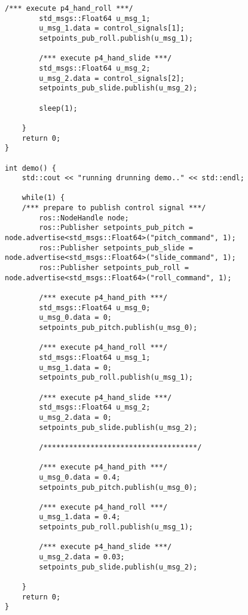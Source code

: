 \begin{lstlisting}[language=gedit]
        /*** execute p4_hand_roll ***/
        std_msgs::Float64 u_msg_1;
        u_msg_1.data = control_signals[1];
        setpoints_pub_roll.publish(u_msg_1);

        /*** execute p4_hand_slide ***/
        std_msgs::Float64 u_msg_2;
        u_msg_2.data = control_signals[2];
        setpoints_pub_slide.publish(u_msg_2);
        
        sleep(1);
 
    }
    return 0;
}

int demo() {
    std::cout << "running drunning demo.." << std::endl;
 
    while(1) {
    /*** prepare to publish control signal ***/ 
        ros::NodeHandle node;
        ros::Publisher setpoints_pub_pitch = node.advertise<std_msgs::Float64>("pitch_command", 1);
        ros::Publisher setpoints_pub_slide = node.advertise<std_msgs::Float64>("slide_command", 1);
        ros::Publisher setpoints_pub_roll = node.advertise<std_msgs::Float64>("roll_command", 1);

        /*** execute p4_hand_pith ***/
        std_msgs::Float64 u_msg_0;
        u_msg_0.data = 0;
        setpoints_pub_pitch.publish(u_msg_0);

        /*** execute p4_hand_roll ***/
        std_msgs::Float64 u_msg_1;
        u_msg_1.data = 0;
        setpoints_pub_roll.publish(u_msg_1);

        /*** execute p4_hand_slide ***/
        std_msgs::Float64 u_msg_2;
        u_msg_2.data = 0;
        setpoints_pub_slide.publish(u_msg_2);

        /************************************/

        /*** execute p4_hand_pith ***/
        u_msg_0.data = 0.4;
        setpoints_pub_pitch.publish(u_msg_0);

        /*** execute p4_hand_roll ***/
        u_msg_1.data = 0.4;
        setpoints_pub_roll.publish(u_msg_1);

        /*** execute p4_hand_slide ***/
        u_msg_2.data = 0.03;
        setpoints_pub_slide.publish(u_msg_2);

    }
    return 0;
}
\end{lstlisting}